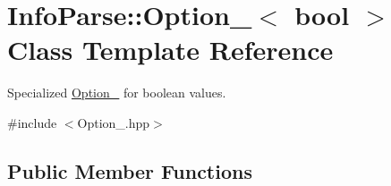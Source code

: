 \hypertarget{class_info_parse_1_1_option___3_01bool_01_4}{}\section{Info\+Parse\+::Option\+\_\+$<$ bool $>$ Class Template Reference}
\label{class_info_parse_1_1_option___3_01bool_01_4}


Specialized \mbox{\hyperlink{class_info_parse_1_1_option__}{Option\+\_\+}} for boolean values.




{\ttfamily \#include $<$Option\+\_\+.\+hpp$>$}

\subsection*{Public Member Functions}

